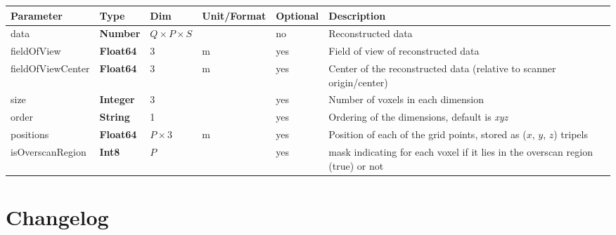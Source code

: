 \documentclass[landscape,a4paper]{article} %
\newcommand{\inltab}[1]{{\ttfamily\bfseries\color{blue}#1}}
\newcommand{\inlvar}[1]{{\ttfamily#1}}
\begin{document}
\noindent \begin{tabularx}{\columnwidth}{lllllX} 
\textbf{Parameter} & \textbf{Type} & \textbf{Dim} & \textbf{Unit/Format} & \textbf{Optional} & \textbf{Description} \\ \hline 
\inlvar{data} & \inltab{Number} & $Q\times P \times S$ & & no & Reconstructed data \\ \hline
\inlvar{fieldOfView} & \inltab{Float64} & $3$ & m & yes & Field of view of reconstructed data \\ \hline
\inlvar{fieldOfViewCenter} & \inltab{Float64} & $3$ & m & yes & Center of the reconstructed data (relative to scanner origin/center) \\ \hline 
\inlvar{size} & \inltab{Integer} & $3$ &  & yes & Number of voxels in each dimension \\ \hline
\inlvar{order} & \inltab{String} & 1 & & yes & Ordering of the dimensions, default is \textit{xyz} \\ \hline
\inlvar{positions} & \inltab{Float64} & $P \times 3$ & m & yes & Position of each of the grid points, stored as ($x$, $y$, $z$) tripels \\ \hline
\inlvar{isOverscanRegion} & \inltab{Int8} & $P$ &  & yes & mask indicating for each voxel if it lies in the overscan region (true) or not \\ \hline
\end{tabularx}


\clearpage
\section{Changelog}
\end{document}

